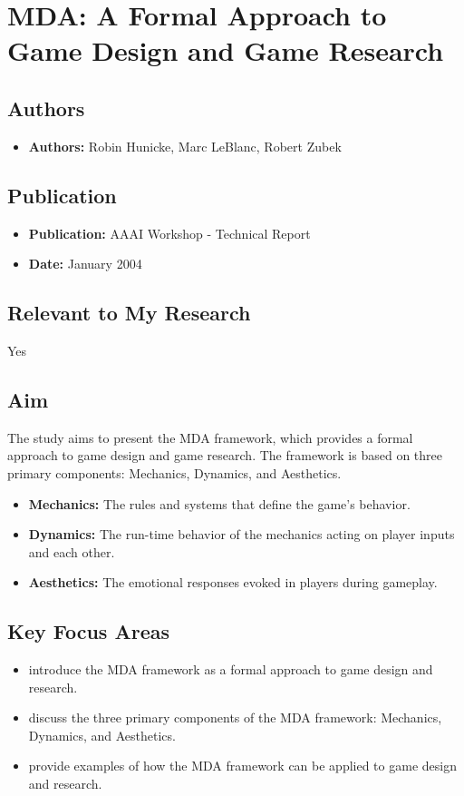 \section{MDA: A Formal Approach to Game Design and Game Research}

\subsection{Authors}
\begin{itemize}
    \item \textbf{Authors:} Robin Hunicke, Marc LeBlanc, Robert Zubek
\end{itemize}

\subsection{Publication}
\begin{itemize}
    \item \textbf{Publication:} AAAI Workshop - Technical Report
    \item \textbf{Date:} January 2004
\end{itemize}

\subsection{Relevant to My Research}
Yes

\subsection{Aim}
The study aims to present the MDA framework, which provides a formal approach to game design and game research. The framework is based on three primary components: Mechanics, Dynamics, and Aesthetics.
\begin{itemize}
    \item \textbf{Mechanics:} The rules and systems that define the game's behavior.
    \item \textbf{Dynamics:} The run-time behavior of the mechanics acting on player inputs and each other.
    \item \textbf{Aesthetics:} The emotional responses evoked in players during gameplay.
\end{itemize}

\subsection{Key Focus Areas}
\begin{itemize}
    \item introduce the MDA framework as a formal approach to game design and research.
    \item discuss the three primary components of the MDA framework: Mechanics, Dynamics, and Aesthetics.
    \item provide examples of how the MDA framework can be applied to game design and research.
\end{itemize}

